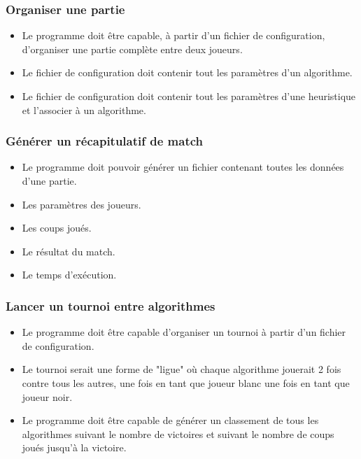 \documentclass{article}
\begin{document}
\subsubsection{Organiser une partie}
\begin{itemize}
    \item Le programme doit être capable, à partir d'un fichier de configuration, d'organiser une partie complète entre deux joueurs.
    \item Le fichier de configuration doit contenir tout les paramètres d'un algorithme.
    \item Le fichier de configuration doit contenir tout les paramètres d'une heuristique et l'associer à un algorithme.
\end{itemize}
\medskip
\subsubsection{Générer un récapitulatif de match}
\begin{itemize}
    \item Le programme doit pouvoir générer un fichier contenant toutes les données d'une partie.
    \item Les paramètres des joueurs.
    \item Les coups joués.
    \item Le résultat du match.
    \item Le temps d'exécution.
\end{itemize}
\medskip
\subsubsection{Lancer un tournoi entre algorithmes}
\begin{itemize}
    \item Le programme doit être capable d'organiser un tournoi à partir d'un fichier de configuration.
    \item Le tournoi serait une forme de "ligue" où chaque algorithme jouerait 2 fois contre tous les autres, une fois en tant que joueur blanc une fois en tant que joueur noir.
    \item Le programme doit être capable de générer un classement de tous les algorithmes suivant le nombre de victoires et suivant le nombre de coups joués jusqu'à la victoire.
\end{itemize}
\medskip
\end{document}
